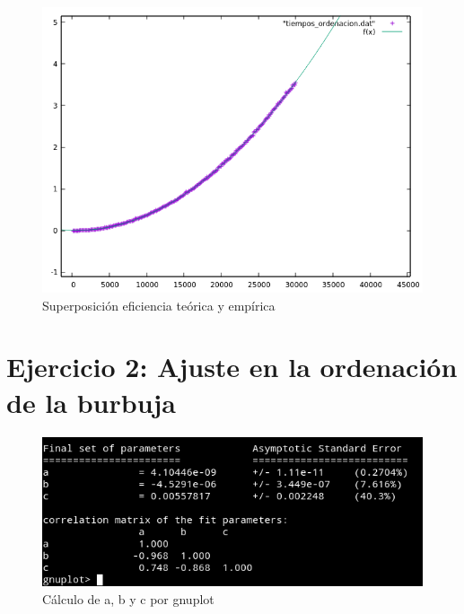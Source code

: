 \begin{figure}[H] %
\centering
\includegraphics[scale=0.6]{ejercicio1/ejercicio1-2.png}  %
\caption{Superposición eficiencia teórica y empírica} 
\label{fig:figura1-2}
\end{figure}


\section{Ejercicio 2: Ajuste en la ordenación de la burbuja}

\begin{figure}[H] %
\centering
\includegraphics[scale=0.8]{ejercicio2/ejercicio2.png}  %
\caption{Cálculo de a, b y c por gnuplot} 
\label{fig:figura2-0}
\end{figure}

